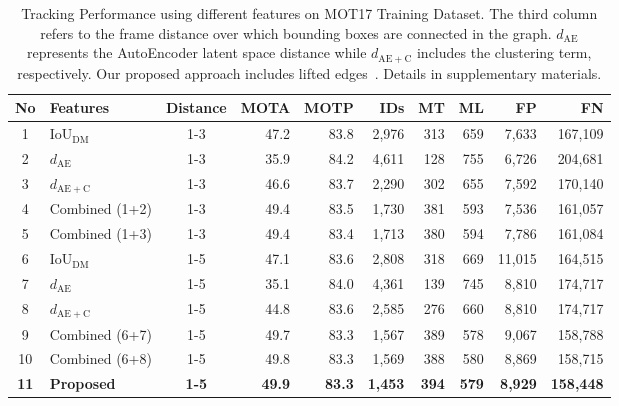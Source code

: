 \begin{table*}[t]
\small
\begin{center}
	\begin{tabular}{c l c r r r r r r r}
		\hline
		No   & Features & Distance & MOTA & MOTP  & IDs & MT & ML & FP & FN \\
		\hline\hline
		1 & IoU$_{\mathrm{DM}}$ & 1-3 & 47.2 & 83.8 & 2,976 & 313 & 659 & 7,633 & 167,109 \\
		2 & $d_{\mathrm{AE}}$ & 1-3 & 35.9 & 84.2 & 4,611 & 128 & 755 & 6,726 & 204,681 \\
		3 & $d_{\mathrm{AE+C}}$ & 1-3 & 46.6 & 83.7 & 2,290 & 302 & 655 & 7,592 & 170,140 \\
		4 & Combined (1+2) & 1-3 & 49.4 & 83.5 & 1,730 & 381 & 593 & 7,536 & 161,057 \\
		5 & Combined (1+3) & 1-3 & 49.4 & 83.4 & 1,713 & 380 & 594 & 7,786 & 161,084  \\
		\hline
		6 & IoU$_{\mathrm{DM}}$ & 1-5 & 47.1 & 83.6 & 2,808 & 318 & 669  & 11,015 & 164,515 \\
		7 & $d_{\mathrm{AE}}$ & 1-5 & 35.1 & 84.0 & 4,361 & 139 & 745  & 8,810 & 174,717 \\
		8 & $d_{\mathrm{AE+C}}$ & 1-5 & 44.8 & 83.6 & 2,585 & 276 & 660 & 8,810 & 174,717 \\
		9 & Combined (6+7) & 1-5 & 49.7 & 83.3 & 1,567 & 389 & 578 & 9,067 & 158,788 \\
		10 & Combined (6+8) & 1-5 & 49.8 & 83.3 & 1,569 & 388 & 580 & 8,869 & 158,715 \\
		\hline
		\textbf{11} & \textbf{Proposed} & \textbf{1-5} & \textbf{49.9} & \textbf{83.3} & \textbf{1,453} & \textbf{394} & \textbf{579} & \textbf{8,929} & \textbf{158,448} \\
		\hline
	\end{tabular}
    \caption{Tracking Performance using different features on MOT17 Training Dataset. The third column refers to the frame distance over which bounding boxes are connected in the graph. $d_{\mathrm{AE}}$ represents the AutoEncoder latent space distance while $d_{\mathrm{AE+C}}$ includes the clustering term, respectively. Our proposed approach includes lifted edges~\cite{tang2017multiple}. Details in supplementary materials.}
\label{tab:mcsetup}
\vspace*{-8mm}
\end{center}
\end{table*}

